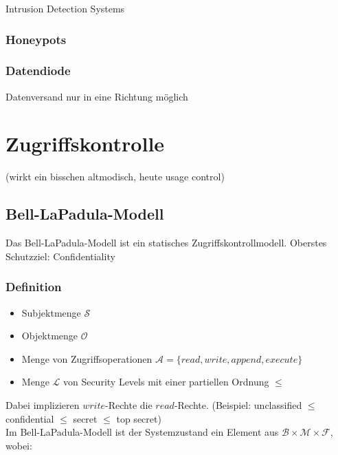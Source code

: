 \documentclass[a4paper,twoside,DIV15,BCOR12mm]{scrbook}
\begin{document}
Intrusion Detection Systems

\subsection{Honeypots}

\subsection{Datendiode}

Datenversand nur in eine Richtung möglich\\



\chapter{Zugriffskontrolle}

(wirkt ein bisschen altmodisch, heute usage control)

\section{Bell-LaPadula-Modell}

Das Bell-LaPadula-Modell ist ein statisches Zugriffskontrollmodell. Oberstes Schutzziel: Confidentiality

\subsection{Definition}

\begin{itemize}
	\item Subjektmenge $\mathcal{S}$
	\item Objektmenge $\mathcal{O}$
	\item Menge von Zugriffsoperationen $\mathcal{A} = \{ read, write, append, execute \}$
	\item Menge $\mathcal{L}$ von Security Levels mit einer partiellen Ordnung $\leq$
\end{itemize}

Dabei implizieren $write$-Rechte die $read$-Rechte. (Beispiel: unclassified $\leq$ confidential $\leq$ secret $\leq$ top secret)\\

Im Bell-LaPadula-Modell ist der Systemzustand ein Element aus $\mathcal{B} \times \mathcal{M} \times \mathcal{F}$, wobei:
\end{document}
